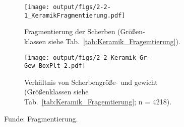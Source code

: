 \begin{figure*}[!tb]
\centering
\begin{subfigure}{0.49\textwidth} %
\centering
\texttt{[image: output/figs/2-2-1\_KeramikFragmentierung.pdf]}
\caption{Fragmentierung der Scherben (Größen-\\klassen siehe Tab.~\ref{tab:Keramik_Fragemtierung}).}
\label{KeramikFragmentierung}
\end{subfigure}
\begin{subfigure}{0.49\textwidth} %
\centering
\texttt{[image: output/figs/2-2\_Keramik\_Gr-Gew\_BoxPlt\_2.pdf]}
\caption{Verhältnis von Scherbengröße- und gewicht (Größenklassen siehe Tab.~\ref{tab:Keramik_Fragemtierung}; n = 4218).}
\label{fig:Keramik_FragmGrGew_B}
\end{subfigure}
\caption{Funde: Fragmentierung.}
\label{fig:Keramik_Typen-Fragm}
\end{figure*}


